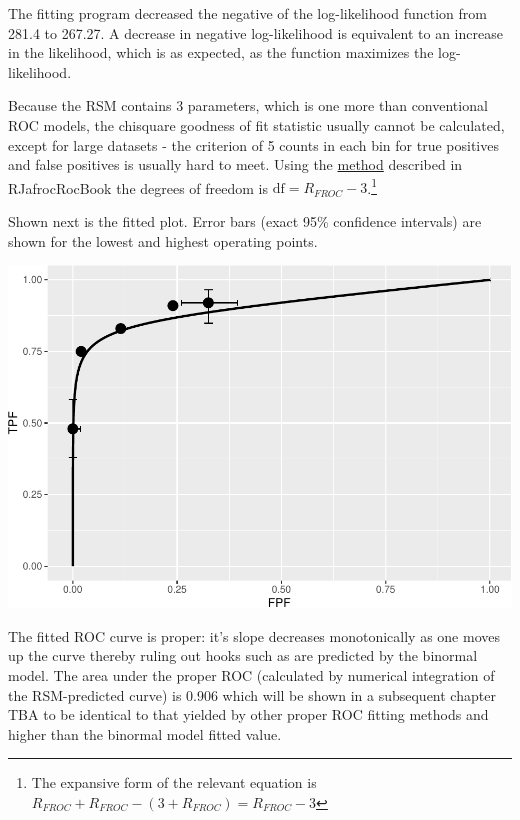 \documentclass[
]{book}
\newenvironment{Shaded}{\begin{snugshade}}{\end{snugshade}}
\newcommand{\KeywordTok}[1]{\textcolor[rgb]{0.13,0.29,0.53}{\textbf{#1}}}
\newcommand{\NormalTok}[1]{#1}
\newcommand{\OperatorTok}[1]{\textcolor[rgb]{0.81,0.36,0.00}{\textbf{#1}}}
\begin{document}
The fitting program decreased the negative of the log-likelihood function from 281.4 to 267.27. A decrease in negative log-likelihood is equivalent to an increase in the likelihood, which is as expected, as the function maximizes the log-likelihood.

Because the RSM contains 3 parameters, which is one more than conventional ROC models, the chisquare goodness of fit statistic usually cannot be calculated, except for large datasets - the criterion of 5 counts in each bin for true positives and false positives is usually hard to meet. Using the \href{https://dpc10ster.github.io/RJafrocRocBook/binormal-model.html\#binormal-model-curve-fitting-validation-appendix-5}{method} described in RJafrocRocBook the degrees of freedom is \(\text{df} = R_{FROC} - 3\).\footnote{The expansive form of the relevant equation is \(R_{FROC} + R_{FROC} - (3 + R_{FROC}) = R_{FROC} - 3\)}

Shown next is the fitted plot. Error bars (exact 95\% confidence intervals) are shown for the lowest and highest operating points.

\begin{Shaded}
\end{Shaded}

\includegraphics{11-rsm-fitting_files/figure-latex/unnamed-chunk-2-1.pdf}

The fitted ROC curve is proper: it's slope decreases monotonically as one moves up the curve thereby ruling out hooks such as are predicted by the binormal model. The area under the proper ROC (calculated by numerical integration of the RSM-predicted curve) is 0.906 which will be shown in a subsequent chapter TBA to be identical to that yielded by other proper ROC fitting methods and higher than the binormal model fitted value.
\end{document}
